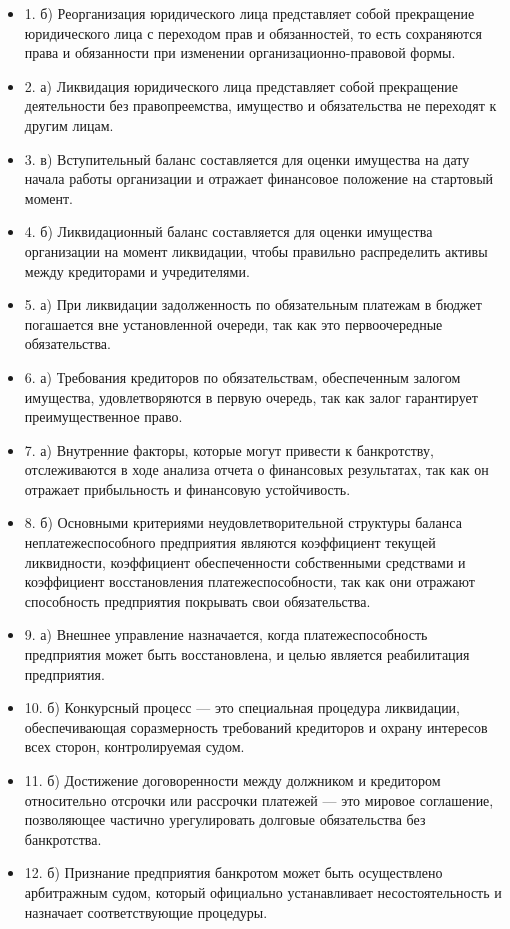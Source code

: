 \documentclass[14pt,a4paper]{extarticle}
\begin{document}
\begin{itemize}
\item 1. б) Реорганизация юридического лица представляет собой прекращение юридического лица с переходом прав и обязанностей, то есть сохраняются права и обязанности при изменении организационно-правовой формы.
\item 2. а) Ликвидация юридического лица представляет собой прекращение деятельности без правопреемства, имущество и обязательства не переходят к другим лицам.
\item 3. в) Вступительный баланс составляется для оценки имущества на дату начала работы организации и отражает финансовое положение на стартовый момент.
\item 4. б) Ликвидационный баланс составляется для оценки имущества организации на момент ликвидации, чтобы правильно распределить активы между кредиторами и учредителями.
\item 5. а) При ликвидации задолженность по обязательным платежам в бюджет погашается вне установленной очереди, так как это первоочередные обязательства.
\item 6. а) Требования кредиторов по обязательствам, обеспеченным залогом имущества, удовлетворяются в первую очередь, так как залог гарантирует преимущественное право.
\item 7. а) Внутренние факторы, которые могут привести к банкротству, отслеживаются в ходе анализа отчета о финансовых результатах, так как он отражает прибыльность и финансовую устойчивость.
\item 8. б) Основными критериями неудовлетворительной структуры баланса неплатежеспособного предприятия являются коэффициент текущей ликвидности, коэффициент обеспеченности собственными средствами и коэффициент восстановления платежеспособности, так как они отражают способность предприятия покрывать свои обязательства.
\item 9. а) Внешнее управление назначается, когда платежеспособность предприятия может быть восстановлена, и целью является реабилитация предприятия.
\item 10. б) Конкурсный процесс — это специальная процедура ликвидации, обеспечивающая соразмерность требований кредиторов и охрану интересов всех сторон, контролируемая судом.
\item 11. б) Достижение договоренности между должником и кредитором относительно отсрочки или рассрочки платежей — это мировое соглашение, позволяющее частично урегулировать долговые обязательства без банкротства.
\item 12. б) Признание предприятия банкротом может быть осуществлено арбитражным судом, который официально устанавливает несостоятельность и назначает соответствующие процедуры.
\end{itemize}
\end{document}
